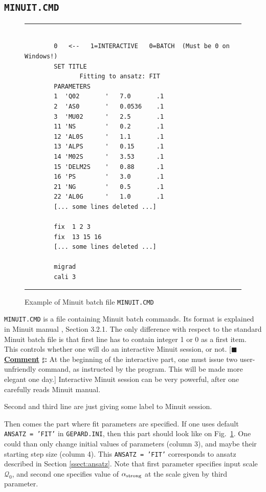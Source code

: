 \documentclass[12pt]{article}
\newcounter{comment}
\newcommand{\comminline}[1]{{%
\refstepcounter{comment}%
\ttfamily\small[$\blacksquare$ \textbf{\underline{Comment}
$\sharp$\thecomment:} #1]}}
\begin{document}
\subsection{\texttt{MINUIT.CMD}}

\begin{figure}[t]
\begin{center}
\hrule
\begin{verbatim}

        0   <--   1=INTERACTIVE   0=BATCH  (Must be 0 on Windows!)
        SET TITLE
               Fitting to ansatz: FIT
        PARAMETERS
        1  'Q02       '   7.0       .1  
        2  'AS0       '   0.0536    .1  
        3  'MU02      '   2.5       .1  
        11 'NS        '   0.2       .1  
        12 'AL0S      '   1.1       .1   
        13 'ALPS      '   0.15      .1  
        14 'M02S      '   3.53      .1
        15 'DELM2S    '   0.88      .1  
        16 'PS        '   3.0       .1  
        21 'NG        '   0.5       .1  
        22 'AL0G      '   1.0       .1   
        [... some lines deleted ...]

        fix  1 2 3 
        fix  13 15 16
        [... some lines deleted ...]

        migrad
        cali 3

\end{verbatim}
\hrule
\end{center}
\caption{Example of Minuit batch file \texttt{MINUIT.CMD}}
\label{fig:MINUIT.CMD}
\end{figure}

\texttt{MINUIT.CMD} is a file containing Minuit batch commands. Its format is explained in
Minuit manual \cite{Minuit}, Section 3.2.1. The only difference with respect to the
standard Minuit batch file is that first line has to contain integer 1 or 0 as a first
item. This controls whether one will do an interactive Minuit session, or not.
\comminline{At the beginning of the interactive part, one must issue two user-unfriendly
command, as instructed by the program. This will be made more elegant one day.}
Interactive Minuit session can be very powerful, after one carefully reads Minuit manual.

Second and third line are just giving some label to Minuit session.

Then comes the part where fit parameters are specified.
If one uses default \texttt{ANSATZ = 'FIT'} in
\texttt{GEPARD.INI}, then this part should look like on
Fig.~\ref{fig:MINUIT.CMD}. One could than only change initial values of parameters
(column 3), and maybe their starting step size (column 4). This \texttt{ANSATZ = 'FIT'} 
corresponds to ansatz described in Section \ref{ssect:ansatz}.  
Note that first parameter specifies input scale $\mathcal{Q}_0$, and second
one specifies value of $\alpha_{\rm strong}$ at the scale given by third parameter.
\end{document}
